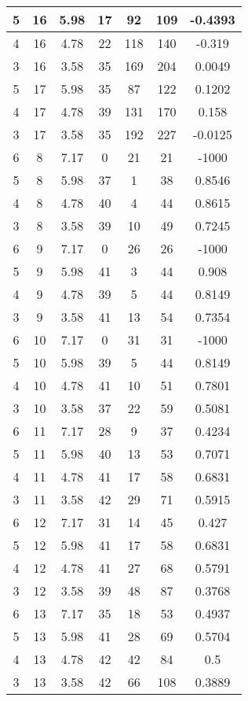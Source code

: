 \documentclass[letterpaper, 12pt]{article}
\begin{document}
\begin{longtable}{|c|c|c|c|c|c|c|}
\hline
5 & 16 & 5.98 & 17 & 92 & 109 & -0.4393 \\
\hline
4 & 16 & 4.78 & 22 & 118 & 140 & -0.319 \\
\hline
3 & 16 & 3.58 & 35 & 169 & 204 & 0.0049 \\
\hline
5 & 17 & 5.98 & 35 & 87 & 122 & 0.1202 \\
\hline
4 & 17 & 4.78 & 39 & 131 & 170 & 0.158 \\
\hline
3 & 17 & 3.58 & 35 & 192 & 227 & -0.0125 \\
\hline
6 & 8 & 7.17 & 0 & 21 & 21 & -1000 \\
\hline
5 & 8 & 5.98 & 37 & 1 & 38 & 0.8546 \\
\hline
4 & 8 & 4.78 & 40 & 4 & 44 & 0.8615 \\
\hline
3 & 8 & 3.58 & 39 & 10 & 49 & 0.7245 \\
\hline
6 & 9 & 7.17 & 0 & 26 & 26 & -1000 \\
\hline
5 & 9 & 5.98 & 41 & 3 & 44 & 0.908 \\
\hline
4 & 9 & 4.78 & 39 & 5 & 44 & 0.8149 \\
\hline
3 & 9 & 3.58 & 41 & 13 & 54 & 0.7354 \\
\hline
6 & 10 & 7.17 & 0 & 31 & 31 & -1000 \\
\hline
5 & 10 & 5.98 & 39 & 5 & 44 & 0.8149 \\
\hline
4 & 10 & 4.78 & 41 & 10 & 51 & 0.7801 \\
\hline
3 & 10 & 3.58 & 37 & 22 & 59 & 0.5081 \\
\hline
6 & 11 & 7.17 & 28 & 9 & 37 & 0.4234 \\
\hline
5 & 11 & 5.98 & 40 & 13 & 53 & 0.7071 \\
\hline
4 & 11 & 4.78 & 41 & 17 & 58 & 0.6831 \\
\hline
3 & 11 & 3.58 & 42 & 29 & 71 & 0.5915 \\
\hline
6 & 12 & 7.17 & 31 & 14 & 45 & 0.427 \\
\hline
5 & 12 & 5.98 & 41 & 17 & 58 & 0.6831 \\
\hline
4 & 12 & 4.78 & 41 & 27 & 68 & 0.5791 \\
\hline
3 & 12 & 3.58 & 39 & 48 & 87 & 0.3768 \\
\hline
6 & 13 & 7.17 & 35 & 18 & 53 & 0.4937 \\
\hline
5 & 13 & 5.98 & 41 & 28 & 69 & 0.5704 \\
\hline
4 & 13 & 4.78 & 42 & 42 & 84 & 0.5 \\
\hline
3 & 13 & 3.58 & 42 & 66 & 108 & 0.3889 \\

\end{longtable}
\end{document}
